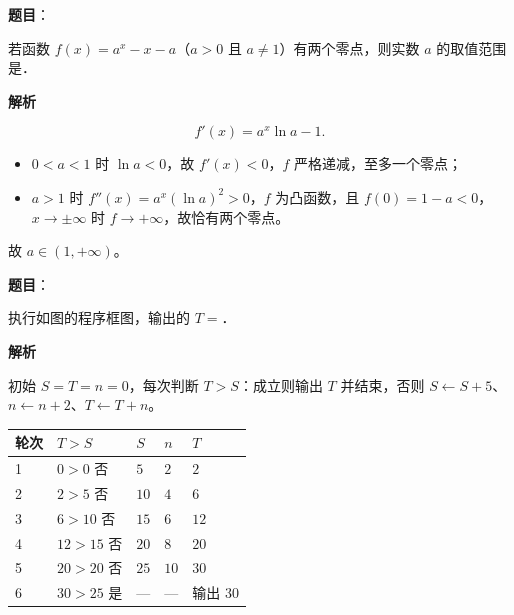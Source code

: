 \begin{answer}

\textbf{题目}：

若函数 $f(x)=a^x-x-a$（$a>0$ 且 $a\neq1$）有两个零点，则实数 $a$ 的取值范围是\gkblank{}．

\textbf{解析}

\nopagebreak[4]
\[f'(x)=a^x\ln a-1 .\]

\begin{itemize}
\item $0<a<1$ 时 $\ln a<0$，故 $f'(x)<0$，$f$ 严格递减，至多一个零点；
\item $a>1$ 时 $f''(x)=a^x(\ln a)^2>0$，$f$ 为凸函数，且 $f(0)=1-a<0$，$x\to\pm\infty$ 时 $f\to+\infty$，故恰有两个零点。
\end{itemize}

故 $a\in(1,+\infty)$。


\end{answer}
\begin{answer}

\textbf{题目}：

执行如图的程序框图，输出的 $T=$\gkblank{}．
\nopagebreak[4]
\begin{center}\end{center}
\nopagebreak[4]
\textbf{解析}

初始 $S=T=n=0$，每次判断 $T>S$：成立则输出 $T$ 并结束，否则 $S\leftarrow S+5$、$n\leftarrow n+2$、$T\leftarrow T+n$。

\begin{center}
\begin{tabular}{lllll}
\toprule
轮次 & $T>S$ & $S$ & $n$ & $T$ \\
\midrule
1 & $0>0$ 否 & $5$ & $2$ & $2$ \\
2 & $2>5$ 否 & $10$ & $4$ & $6$ \\
3 & $6>10$ 否 & $15$ & $6$ & $12$ \\
4 & $12>15$ 否 & $20$ & $8$ & $20$ \\
5 & $20>20$ 否 & $25$ & $10$ & $30$ \\
6 & $30>25$ 是 & — & — & 输出 $30$ \\
\bottomrule
\end{tabular}
\end{center}


\end{answer}
